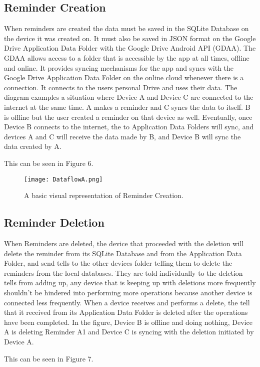 \documentclass[12pt]{article}
\begin{document}
\subsection{Reminder Creation}
When reminders are created the data must be saved in the SQLite Database on the device it was created on. It must also be saved in JSON format on the Google Drive Application Data Folder with the Google Drive Android API (GDAA). The GDAA allows access to a folder that is accessible by the app at all times, offline and online. It provides syncing mechanisms for the app and syncs with the Google Drive Application Data Folder on the online cloud whenever there is a connection. It connects to the users personal Drive and uses their data. The diagram examples a situation where Device A and Device C are connected to the internet at the same time. A makes a reminder and C syncs the data to itself. B is offline but the user created a reminder on that device as well. Eventually, once Device B connects to the internet, the to Application Data Folders will sync, and devices A and C will receive the data made by B, and Device B will sync the data created by A.

This can be seen in Figure 6.

\begin{figure}[h]
\texttt{[image: DataflowA.png]}
\centering
\caption{A basic visual representation of Reminder Creation.}
\end{figure}


\subsection{Reminder Deletion}
When Reminders are deleted, the device that proceeded with the deletion will delete the reminder from its SQLite Database and from the Application Data Folder, and send tells to the other devices folder telling them to delete the reminders from the local databases. They are told individually to the deletion tells from adding up, any device that is keeping up with deletions more frequently shouldn’t be hindered into performing more operations because another device is connected less frequently. When a device receives and performs a delete, the tell that it received from its Application Data Folder is deleted after the operations have been completed. In the figure, Device B is offline and doing nothing, Device A is deleting Reminder A1 and Device C is syncing with the deletion initiated by Device A.

This can be seen in Figure 7.
\end{document}
